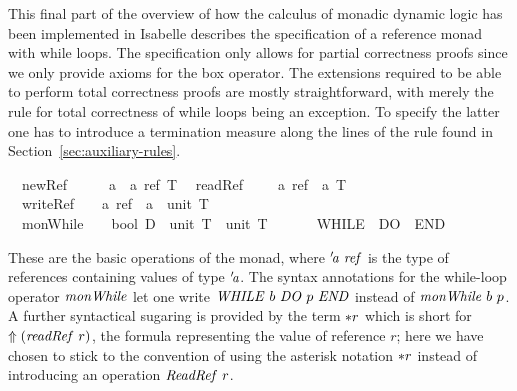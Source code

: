 This final part of the overview of how the calculus of monadic dynamic logic has
been implemented in Isabelle describes the specification of a reference monad
with while loops. The specification only allows for partial correctness proofs
since we only provide axioms for the box operator. The extensions required to be
able to perform total correctness proofs are mostly straightforward, with merely
the rule for total correctness of while loops being an exception. To specify the
latter one has to introduce a termination measure along the lines of the rule
found in Section~\ref{sec:auxiliary-rules}.
\begin{isabellebody}
\isanewline
{}\isanewline
\ \ newRef\ \ \ \ \ {\isacharcolon}{\isacharcolon}\ {\isachardoublequote}{\isacharprime}a\ {\isasymRightarrow}\ {\isacharprime}a\ ref\ T{\isachardoublequote}\isanewline
\ \ readRef\ \ \ \ {\isacharcolon}{\isacharcolon}\ {\isachardoublequote}{\isacharprime}a\ ref\ {\isasymRightarrow}\ {\isacharprime}a\ T{\isachardoublequote}\ \ \ \ \ \ \ \ \ \ \ \ \ \ \ \isanewline
\ \ writeRef\ \ \ {\isacharcolon}{\isacharcolon}\ {\isachardoublequote}{\isacharprime}a\ ref\ {\isasymRightarrow}\ {\isacharprime}a\ {\isasymRightarrow}\ unit\ T{\isachardoublequote}\ \ \ \ \ \ \ \ \ \ \ {\isacharparenleft}{\isachardoublequote}{\isacharparenleft}{\isacharunderscore}\ {\isacharcolon}{\isacharequal}\ {\isacharunderscore}{\isacharparenright}{\isachardoublequote}\ {\isacharbrackleft}{}{}{}{\isacharcomma}\ {}{}{\isacharbrackright}\ {}{}{\isacharparenright}\isanewline
\ \ monWhile\ \ \ {\isacharcolon}{\isacharcolon}\ {\isachardoublequote}bool\ D\ {\isasymRightarrow}\ unit\ T\ {\isasymRightarrow}\ unit\ T{\isachardoublequote}\ \ \ \ \ \ \ {\isacharparenleft}{\isachardoublequote}WHILE\ {\isacharparenleft}{}{\isacharunderscore}{\isacharparenright}\ {\isacharslash}DO\ {\isacharparenleft}{}{\isacharunderscore}{\isacharparenright}\ {\isacharslash}END{\isachardoublequote}{\isacharparenright}\isamarkupfalse%
\isanewline
\end{isabellebody}
These are the basic operations of the monad, where ${'\!\mathit{a}}\ \mathit{ref}$ is the
type of references containing values of type ${'\!\mathit{a}}$. The syntax annotations
for the while-loop operator $\mathit{monWhile}$ let one write $\mathit{WHILE}\ b\
\mathit{DO}\ p\ \mathit{END}$ instead of $\mathit{monWhile}\ b\ p$. A further syntactical
sugaring is provided by the term ${\ast r}$ which is short for $\Uparrow (\mathit{readRef}\
r)$, \IE the formula representing the value of reference $r$; here we have
chosen to stick to the convention of using the asterisk notation ${\ast r}$
instead of introducing an operation $\op{ReadRef}\ r$.

